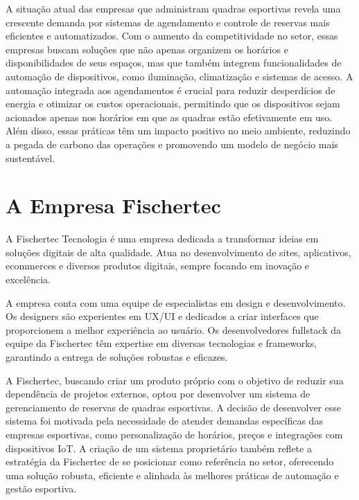 

A situação atual das empresas que administram quadras esportivas revela uma crescente demanda por sistemas de agendamento e controle de reservas mais eficientes e automatizados. Com o aumento da competitividade no setor, essas empresas buscam soluções que não apenas organizem os horários e disponibilidades de seus espaços, mas que também integrem funcionalidades de automação de dispositivos, como iluminação, climatização e sistemas de acesso. A automação integrada aos agendamentos é crucial para reduzir desperdícios de energia e otimizar os custos operacionais, permitindo que os dispositivos sejam acionados apenas nos horários em que as quadras estão efetivamente em uso. Além disso, essas práticas têm um impacto positivo no meio ambiente, reduzindo a pegada de carbono das operações e promovendo um modelo de negócio mais sustentável.

\section{A Empresa Fischertec}

A Fischertec Tecnologia é uma empresa dedicada a transformar ideias em soluções digitais de alta qualidade. Atua no desenvolvimento de sites, aplicativos, ecommerces e diversos produtos digitais, sempre focando em inovação e excelência.

A empresa conta com uma equipe de especialistas em design e desenvolvimento. Os designers são experientes em UX/UI e dedicados a criar interfaces que proporcionem a melhor experiência ao usuário. Os desenvolvedores fullstack da equipe da Fischertec têm expertise em diversas tecnologias e frameworks, garantindo a entrega de soluções robustas e eficazes.

A Fischertec, buscando criar um produto próprio com o objetivo de reduzir sua dependência de projetos externos, optou por desenvolver um sistema de gerenciamento de reservas de quadras esportivas. A decisão de desenvolver esse sistema foi motivada pela necessidade de atender demandas específicas das empresas esportivas, como personalização de horários, preços e integrações com dispositivos IoT. A criação de um sistema proprietário também reflete a estratégia da Fischertec de se posicionar como referência no setor, oferecendo uma solução robusta, eficiente e alinhada às melhores práticas de automação e gestão esportiva.

